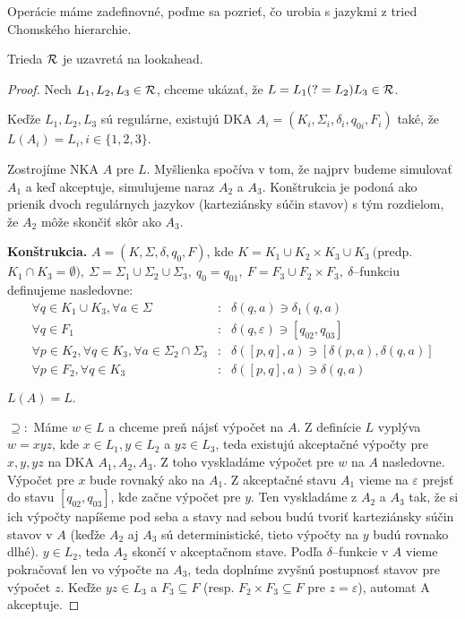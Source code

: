 Operácie máme zadefinovné, poďme sa pozrieť, čo urobia s jazykmi z tried Chomského hierarchie.

\begin{lema}
Trieda ${\cal R}$ je uzavretá na lookahead.
\end{lema}
\begin{proof}
Nech $ L_{1}, L_{2}, L_{3} \in {\cal R} $, chceme ukázať, že  $ L = L_{1}(?=L_{2})L_{3} \in {\cal R} $.

Keďže $ L_{1},L_{2},L_{3} $ sú regulárne, existujú DKA $ A_{i} = (K_{i},\Sigma_{i},\delta_{i},q_{0i},F_{i}) $ také, že $ L(A_{i})=L_{i}, i \in \lbrace 1,2,3\rbrace $. 

Zostrojíme NKA $ A $ pre $L$. Myšlienka spočíva v tom, že najprv budeme simulovať $A_1$ a keď akceptuje, simulujeme naraz $A_2$ a $A_3$. Konštrukcia je podoná ako prienik dvoch regulárnych jazykov (karteziánsky súčin stavov) s tým rozdielom, že $A_2$ môže skončiť skôr ako $A_3$.

\textbf{Konštrukcia.}  $ A = (K,\Sigma,\delta,q_{0},F) $, kde
$ K = K_{1} \cup K_{2} \times K_{3} \cup K_{3} ~ ( $predp. $ K_{1} \cap K_{3}= \emptyset), ~
\Sigma=\Sigma_{1}\cup\Sigma_{2}\cup\Sigma_{3}, ~ q_{0}=q_{01}, ~ F = F_{3} \cup F_{2} \times F_{3}, ~ \delta $--funkciu definujeme nasledovne:
\begin{eqnarray*}
\forall q \in K_{1} \cup K_3, \forall a \in \Sigma &:& \delta(q,a) \ni \delta_{1}(q,a) \\
\forall q \in F_{1} &:& \delta(q,\varepsilon ) \ni \left[ q_{02},q_{03} \right] \\
\forall p \in K_{2}, \forall q \in K_{3}, \forall a \in \Sigma_{2} \cap \Sigma_{3} &:& \delta( \left[ p,q \right] ,a) \ni \left[ \delta(p,a), \delta (q,a) \right] \\
\forall p \in F_2, \forall q \in K_3 &:& \delta(\left[p,q\right],a) \ni \delta(q,a) 
\end{eqnarray*}

$ L(A) = L. $

$ \supseteq: $ Máme $ w \in L $ a chceme preň nájsť výpočet na $A$. Z definície $L$ vyplýva $w=xyz$, kde $x \in L_1, y \in L_2$ a $yz \in L_3$, teda existujú akceptačné výpočty pre $x,y,yz$ na DKA $A_1,A_2,A_3$. Z toho vyskladáme výpočet pre $w$ na $A$ nasledovne. Výpočet pre $x$ bude rovnaký ako na $A_1$. Z akceptačné stavu $A_1$ vieme na $\varepsilon$ prejsť do stavu $\left[q_{02},q_{03}\right]$, kde začne výpočet pre $y$. Ten vyskladáme z $A_2$ a $A_3$ tak, že si ich výpočty napíšeme pod seba a stavy nad sebou budú tvoriť karteziánsky súčin stavov v $A$ (keďže $A_2$ aj $A_3$ sú deterministické, tieto výpočty na $y$ budú rovnako dlhé). $y \in L_2$, teda $A_2$ skončí v akceptačnom stave. Podľa $\delta$--funkcie v $A$ vieme pokračovať len vo výpočte na $A_3$, teda doplníme zvyšnú postupnosť stavov pre výpočet $z$. Keďže $yz \in L_3$ a $F_3\subseteq F$ (resp. $F_2\times F_3\subseteq F$ pre $z=\varepsilon$), automat A akceptuje. 


\end{proof}
